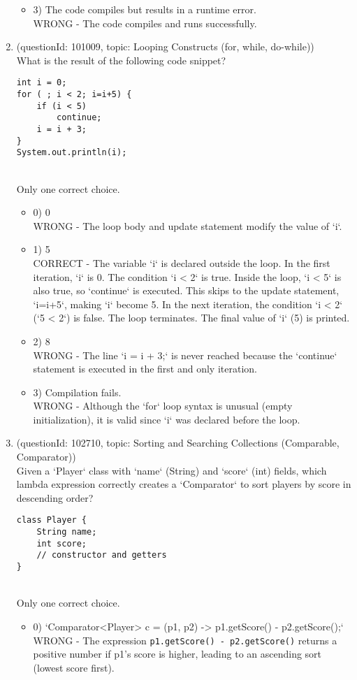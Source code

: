 \documentclass[12pt]{article}
\begin{document}
\begin{enumerate}[label=(\arabic*)]
\begin{itemize}
\item 3) The code compiles but results in a runtime error.
 \\ 
WRONG - The code compiles and runs successfully.

\end{itemize}
\item (questionId: 101009, topic: Looping Constructs (for, while, do-while)) \\ 
What is the result of the following code snippet?\n\begin{verbatim}
int i = 0;
for ( ; i < 2; i=i+5) {
    if (i < 5)
        continue;
    i = i + 3;
}
System.out.println(i);
\end{verbatim}
\\ \noindent Only one correct choice. 
\begin{itemize}
\item 0) 0
 \\ 
WRONG - The loop body and update statement modify the value of `i`.

\item 1) 5
 \\ 
CORRECT - The variable `i` is declared outside the loop. In the first iteration, `i` is 0. The condition `i < 2` is true. Inside the loop, `i < 5` is also true, so `continue` is executed. This skips to the update statement, `i=i+5`, making `i` become 5. In the next iteration, the condition `i < 2` (`5 < 2`) is false. The loop terminates. The final value of `i` (5) is printed.

\item 2) 8
 \\ 
WRONG - The line `i = i + 3;` is never reached because the `continue` statement is executed in the first and only iteration.

\item 3) Compilation fails.
 \\ 
WRONG - Although the `for` loop syntax is unusual (empty initialization), it is valid since `i` was declared before the loop.

\end{itemize}
\item (questionId: 102710, topic: Sorting and Searching Collections (Comparable, Comparator)) \\ 
Given a `Player` class with `name` (String) and `score` (int) fields, which lambda expression correctly creates a `Comparator` to sort players by score in descending order?
\begin{verbatim}
class Player {
    String name;
    int score;
    // constructor and getters
}
\end{verbatim}
\\ \noindent Only one correct choice. 
\begin{itemize}
\item 0) `Comparator<Player> c = (p1, p2) -> p1.getScore() - p2.getScore();`
 \\ 
WRONG - The expression \verb|p1.getScore() - p2.getScore()| returns a positive number if p1's score is higher, leading to an ascending sort (lowest score first).


\end{itemize}
\end{enumerate}
\end{document}

